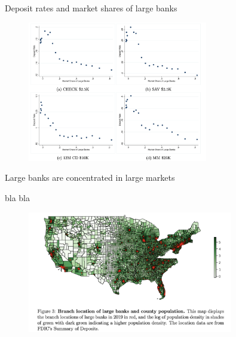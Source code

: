 \documentclass[notes,10pt, aspectratio=169]{beamer}
\newenvironment{wideitemize}{\itemize\addtolength{\itemsep}{10pt}}{\enditemize}
\begin{document}
    \begin{frame}{Deposit rates and market shares of large banks}

    
        \begin{figure}
            \centering
            \includegraphics[width=0.7\textwidth]{imgs/fig2.png}
        \end{figure}
        
    \end{frame}

\begin{frame}{Large banks are concentrated in large markets}

    
        \begin{wideitemize}
            \item bla bla
    \end{wideitemize}
    
    \begin{figure}
    \centering
    \includegraphics[width=0.8\textwidth]{imgs/fig3_foot.png}
    \end{figure}
    
    \end{frame}
\end{document}
